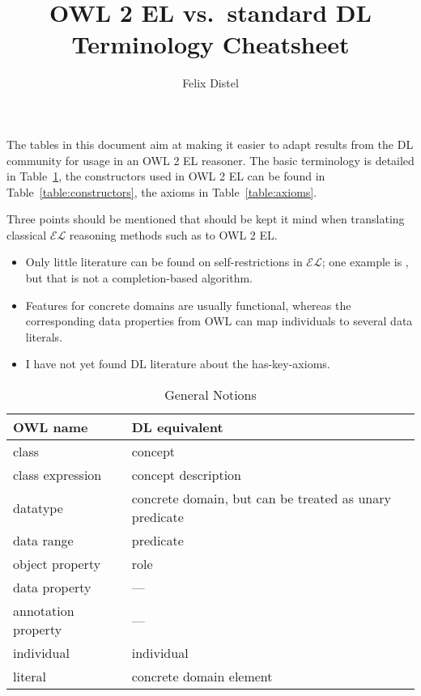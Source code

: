 \documentclass{article}
\title{OWL 2 EL vs.\ standard DL Terminology Cheatsheet}
\author{Felix Distel}
\begin{document}
\maketitle

The tables in this document aim at making it easier to adapt results from
the DL community for usage in an OWL 2 EL reasoner. The basic terminology is
detailed in Table~\ref{table:general}, the constructors used in OWL 2 EL can be
found in Table~\ref{table:constructors}, the axioms in
Table~\ref{table:axioms}.

Three points should be mentioned that should be kept it mind when translating
classical $\mathcal{EL}$ reasoning methods such as
\cite{BaaderBrandtLutz-IJCAI-05,BaaderEtAl-OWLED08DC,Sunt-09} to OWL 2 EL.
\begin{itemize}
  \item Only little literature can be found on self-restrictions in
    $\mathcal{EL}$; one example is \cite{carral2013towards}, but that is not a
    completion-based algorithm.
  \item Features for concrete domains are usually functional, whereas the
    corresponding data properties from OWL can map individuals to several data
    literals.
  \item I have not yet found DL literature about the has-key-axioms.
\end{itemize}

\begin{table}
  \caption{General Notions\label{table:general}}
  \begin{center}
    \begin{tabular}{@{}ll@{}}
      \toprule
      OWL name & DL equivalent \\
      \midrule
      class & concept \\
      class expression & concept description \\
      datatype & concrete domain, but can be treated as unary predicate \\
      data range & predicate\footnotemark[1]\\
      object property & role \\
      data property & ---\footnotemark[2]\\
      annotation property & --- \\
      individual & individual \\
      literal & concrete domain element \\
      \bottomrule
    \end{tabular}
  \end{center}
\end{table}
\end{document}
